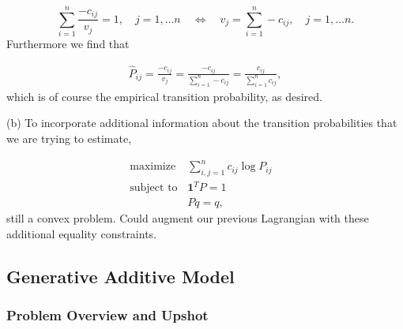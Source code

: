 \documentclass[12pt,reqno]{article}
\theoremstyle{definition}
\numberwithin{equation}{section}
\begin{document}
\[\sum_{i=1}^{n}\frac{-c_{ij}}{v_{j}} = 1, \quad j= 1, \ldots n \quad \Longleftrightarrow \quad v_j = \sum_{i=1}^{n}-c_{ij}, \quad j = 1, \ldots n.\]
Furthermore we find that

\[\begin{aligned}
    \hat{P}_{ij} = \frac{-c_{ij}}{v_{j}} = \frac{-c_{ij}}{\sum_{i=1}^{n}-c_{ij}} = \frac{c_{ij}}{\sum_{i=1}^{n}c_{ij}},
\end{aligned}\]
which is of course the empirical transition probability, as desired.

\vspace{0.1cm}
\noindent (b) To incorporate additional information about the transition probabilities that we are trying to estimate,

\[\begin{array}{lll}
    \text{maximize} \; & \sum_{i, j=1}^{n} c_{ij}\log P_{ij} & \\
    \text{subject to} & \bm{1}^T P = 1 & \\
    & Pq = q,
    \end{array}\]
still a convex problem. Could augment our previous Lagrangian with these additional equality constraints.

\subsection{Generative Additive Model}

\subsubsection*{Problem Overview and Upshot}
\end{document}
